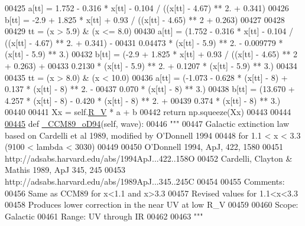 \begin{DoxyCode}
00425         a[tt] = 1.752 - 0.316 * x[tt] - 0.104 / ((x[tt] - 4.67) ** 2. + 0.341)
00426         b[tt] = -2.9 + 1.825 * x[tt] + 0.93 / ((x[tt] - 4.65) ** 2 + 0.263)
00427         
00428         
00429         tt = (x > 5.9) & (x <= 8.0)
00430         a[tt] = (1.752 - 0.316 * x[tt] - 0.104 / ((x[tt] - 4.67) ** 2. + 0.341) - 
00431                  0.04473 * (x[tt] - 5.9) ** 2. - 0.009779 * (x[tt] - 5.9) ** 3.)
00432         b[tt] = (-2.9 + 1.825 * x[tt] + 0.93 / ((x[tt] - 4.65) ** 2 + 0.263) + 
00433                  0.2130 * (x[tt] - 5.9) ** 2. + 0.1207 * (x[tt] - 5.9) ** 3.)
00434         
00435         tt = (x > 8.0) & (x < 10.0)
00436         a[tt] = (-1.073 - 0.628 * (x[tt] - 8) + 0.137 * (x[tt] - 8) ** 2. - 
00437                  0.070 * (x[tt] - 8) ** 3.)
00438         b[tt] = (13.670 + 4.257 * (x[tt] - 8) - 0.420 * (x[tt] - 8) ** 2. + 
00439                  0.374 * (x[tt] - 8) ** 3.)
00440         
00441         Xx = self.\hyperlink{classpyneb_1_1extinction_1_1red__corr_1_1_red_corr_a4696ecdd84c912c20e6aa19b1573e875}{R\_V} * a + b
00442         \textcolor{keywordflow}{return} np.squeeze(Xx)
00443     
00444 
\hypertarget{red__corr_8py_source_l00445}{}\hyperlink{classpyneb_1_1extinction_1_1red__corr_1_1_red_corr_a87841a3694fd368a8583680623936e29}{00445}     \textcolor{keyword}{def }\hyperlink{classpyneb_1_1extinction_1_1red__corr_1_1_red_corr_a87841a3694fd368a8583680623936e29}{\_CCM89\_oD94}(self, wave):
00446         \textcolor{stringliteral}{"""}
00447 \textcolor{stringliteral}{        Galactic extinction law based on Cardelli et al 1989, modified by O'Donnell 1994}
00448 \textcolor{stringliteral}{        for 1.1 < x < 3.3 (9100 < lambda < 3030)}
00449 \textcolor{stringliteral}{        }
00450 \textcolor{stringliteral}{        O'Donnell 1994, ApJ, 422, 1580}
00451 \textcolor{stringliteral}{        http://adsabs.harvard.edu/abs/1994ApJ...422..158O}
00452 \textcolor{stringliteral}{        Cardelli, Clayton & Mathis 1989, ApJ 345, 245}
00453 \textcolor{stringliteral}{        http://adsabs.harvard.edu/abs/1989ApJ...345..245C}
00454 \textcolor{stringliteral}{}
00455 \textcolor{stringliteral}{        Comments:}
00456 \textcolor{stringliteral}{        Same as CCM89 for x<1.1 and x>3.3}
00457 \textcolor{stringliteral}{        Revised values for 1.1<x<3.3}
00458 \textcolor{stringliteral}{        Produces lower correction in the near UV at low R\_V}
00459 \textcolor{stringliteral}{        }
00460 \textcolor{stringliteral}{        Scope: Galactic}
00461 \textcolor{stringliteral}{        Range: UV through IR}
00462 \textcolor{stringliteral}{        }
00463 \textcolor{stringliteral}{        """}

\end{DoxyCode}
